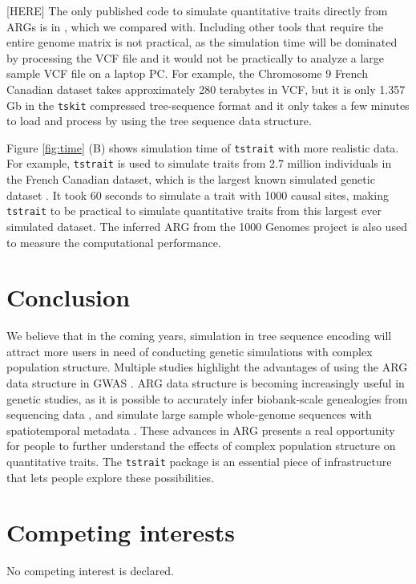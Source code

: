 \documentclass[unnumsec,webpdf,modern,large,namedate]{oup-authoring-template}%
\begin{document}
[HERE]
The only published code to simulate quantitative traits
directly from ARGs is in \cite{martin2017}, which we compared with. Including
other tools that require the entire genome matrix is not practical, as the
simulation time will be dominated by processing the VCF file and it would not
be practically to analyze a large sample VCF file on a laptop PC. For example,
the Chromosome 9 French Canadian dataset takes approximately 280 terabytes in
VCF, but it is only 1.357 Gb in the \texttt{tskit} compressed
tree-sequence format and it only takes a few minutes to load and process by
using the tree sequence data structure.

Figure \ref{fig:time} (B) shows simulation time of \texttt{tstrait} with more
realistic data. For example, \texttt{tstrait} is used to simulate traits from
2.7 million individuals in the French Canadian dataset, which is the largest
known simulated genetic dataset \citep{anderson2023}. It took 60 seconds to
simulate a trait with 1000 causal sites, making \texttt{tstrait} to be
practical to simulate quantitative traits from this largest ever simulated
dataset. The inferred ARG from the 1000 Genomes project \citep{kelleher2019} is
also used to measure the computational performance.


\section{Conclusion}

We believe that in the coming years, simulation in tree sequence encoding will
attract more users in need of conducting genetic simulations with complex
population structure. Multiple studies highlight the advantages of using the
ARG data structure in GWAS \citep{link2023tree,nowbandegani2023extremely,zhang2023}.
ARG data
structure is becoming increasingly useful in genetic studies, as it is possible
to accurately infer biobank-scale genealogies from sequencing data
\citep{zhang2023}, and simulate large sample whole-genome sequences with
spatiotemporal metadata \citep{anderson2023}. These advances in ARG presents a
real opportunity for people to further understand the effects of complex
population structure on quantitative traits. The \texttt{tstrait} package is an
essential piece of infrastructure that lets people explore these possibilities.

\section{Competing interests}
No competing interest is declared.
\end{document}
